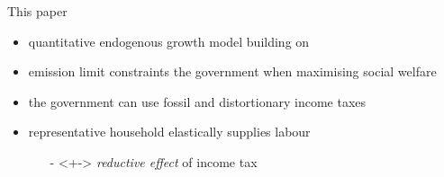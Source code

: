\documentclass[11pt,aspectratio=169]{beamer}
\begin{document}
\begin{frame}{This paper}
	\begin{itemize}
		\item quantitative \alert{endogenous growth} model building on \cite{Fried2018ClimateAnalysis}
		\vspace{3mm}
		\item  \alert{emission limit constraints} the government when  {maximising social welfare}
		\vspace{3mm}
		\item the government can use \alert{fossil} and \alert{distortionary income taxes}
		\vspace{3mm}
		\item  representative household \alert{elastically} supplies labour 
		\vspace{2mm}
		\begin{itemize}
			\item[-]<+-> \textit{reductive effect} of income tax
			\vspace{1mm}
			\item[]%
		\end{itemize}
		
	\end{itemize}
\end{frame}
\addtocounter{framenumber}{-1}
\end{document}
